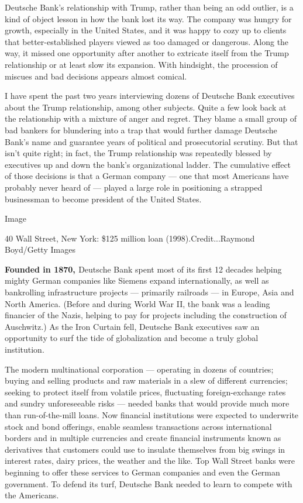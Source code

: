 ­Deutsche Bank's relationship with Trump, rather than being an odd
outlier, is a kind of object lesson in how the bank lost its way. The
company was hungry for growth, especially in the United States, and it
was happy to cozy up to clients that better-­established players viewed
as too damaged or dangerous. Along the way, it missed one opportunity
after another to extricate itself from the Trump relationship or at
least slow its expansion. With hindsight, the procession of miscues and
bad decisions appears almost comical.

I have spent the past two years interviewing dozens of ­Deutsche Bank
executives about the Trump relationship, among other subjects. Quite a
few look back at the relationship with a mixture of anger and regret.
They blame a small group of bad bankers for blundering into a trap that
would further damage ­Deutsche Bank's name and guarantee years of
political and prosecutorial scrutiny. But that isn't quite right; in
fact, the Trump relationship was repeatedly blessed by executives up and
down the bank's organizational ladder. The cumulative effect of those
decisions is that a German company --- one that most Americans have
probably never heard of --- played a large role in positioning a
strapped businessman to become president of the United States.

Image

40 Wall Street, New York: \$125 million loan (1998).Credit...Raymond
Boyd/Getty Images

\textbf{Founded in 1870, ­}Deutsche Bank spent most of its first 12
decades helping mighty German companies like Siemens expand
internationally, as well as bankrolling infrastructure projects ---
primarily railroads --- in Europe, Asia and North America. (Before and
during World War II, the bank was a leading financier of the Nazis,
helping to pay for projects including the construction of Auschwitz.) As
the Iron Curtain fell, ­Deutsche Bank executives saw an opportunity to
surf the tide of globalization and become a truly global institution.

The modern multinational corporation --- operating in dozens of
countries; buying and selling products and raw materials in a slew of
different currencies; seeking to protect itself from volatile prices,
fluctuating foreign-­exchange rates and sundry unforeseeable risks ---
needed banks that would provide much more than run-of-the-mill loans.
Now financial institutions were expected to underwrite stock and bond
offerings, enable seamless transactions across international borders and
in multiple currencies and create financial instruments known as
derivatives that customers could use to insulate themselves from big
swings in interest rates, dairy prices, the weather and the like. Top
Wall Street banks were beginning to offer these services to German
companies and even the German government. To defend its turf, ­Deutsche
Bank needed to learn to compete with the Americans.

